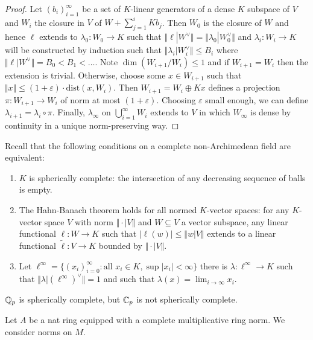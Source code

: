 \begin{proof}
    Let $(b_{i})_{i=1}^{\infty}$ be a set of $K$-linear generators of a dense $K$ subspace of $V$ and $W_{i}$ the closure in $V$ of $W+\sum_{j=1}^{i}K b_{j}$. Then $W_{0}$ is the closure of $W$ and hence $\ell$ extends to $\lambda_{0}:W_{0}\to K$ such that $\Vert\ell|W^{\vee}\Vert=\Vert\lambda_{0}|W_{0}^{\vee}\Vert$ and $\lambda_{i}:W_{i}\to K$ will be constructed by induction such that $\Vert\lambda_{i}|W_{i}^{\vee}\Vert\leq B_{i}$ where $\Vert\ell|W^{\vee}\Vert=B_{0}<B_{1}<\dots$. Note $\dim(W_{i+1}/W_{i})\leq 1$ and if $W_{i+1}=W_{i}$ then the extension is trivial. Otherwise, choose some $x\in W_{i+1}$ such that $\Vert x\Vert\leq (1+\varepsilon)\cdot\mathrm{dist}(x,W_{i})$. Then $W_{i+1}=W_{i}\oplus Kx$ defines a projection $\pi:W_{i+1}\to W_{i}$ of norm at most $(1+\varepsilon)$. Choosing $\varepsilon$ small enough, we can define $\lambda_{i+1}=\lambda_{i}\circ\pi$. Finally, $\lambda_{\infty}$ on $\bigcup_{i=1}^{\infty}W_{i}$ extends to $V$ in which $W_{\infty}$ is dense by continuity in a unique norm-preserving way. 
\end{proof}
\begin{remark}
    Recall that the following conditions on a complete non-Archimedean field are equivalent: 
    \begin{enumerate}[label=(\roman*)]
        \item $K$ is spherically complete: the intersection of any decreasing sequence of balls is empty. 
        \item The Hahn-Banach theorem holds for all normed $K$-vector spaces: for any $K$-vector space $V$ with norm $\Vert\cdot|V\Vert$ and $W\subseteq V$ a vector subspace, any linear functional $\ell:W\to K$ such that $|\ell(w)|\leq\Vert w|V\Vert$ extends to a linear functional $\widetilde{\ell}:V\to K$ bounded by $\Vert\cdot|V\Vert$. 
        \item Let $\ell^{\infty}=\{(x_{i})_{i=0}^{\infty}:\text{all }x_{i}\in K, \sup|x_{i}|<\infty\}$ there is $\lambda:\ell^{\infty}\to K$ such that $\Vert\lambda|(\ell^{\infty})^{\vee}\Vert=1$ and such that $\lambda(x)=\lim_{i\to\infty}x_{i}$. 
    \end{enumerate}
\end{remark}
\begin{example}
    $\mathbb{Q}_{p}$ is spherically complete, but $\mathbb{C}_{p}$ is not spherically complete. 
\end{example}
Let $A$ be a nat ring  equipped with a complete multiplicative ring norm. We consider norms on $M$. 
